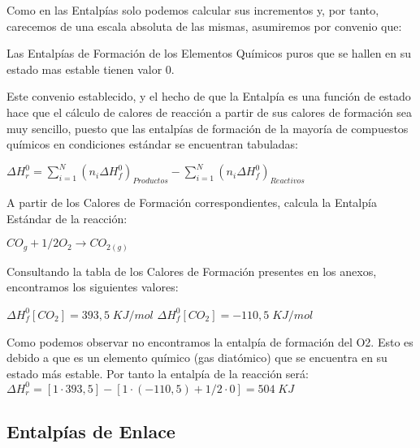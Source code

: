 Como en las Entalpías solo podemos calcular sus incrementos y, por tanto, carecemos de una escala absoluta de las mismas, asumiremos por convenio que:\\

\begin{definition}
Las Entalpías de Formación de los Elementos Químicos puros que se hallen en su estado mas estable tienen valor 0.
\end{definition}

Este convenio establecido, y el hecho de que la Entalpía es una función de estado hace que el cálculo de calores de reacción a partir de sus calores de formación sea muy sencillo, puesto que las entalpías de formación de la mayoría de compuestos químicos en condiciones estándar se encuentran tabuladas:

\begin{center}
	$\Delta H^{0}_r = \displaystyle\sum_{i = 1}^{N}(n_i\Delta H^{0}_f)_{Productos} - \displaystyle\sum_{i=1}^{N}(n_i\Delta H^{0}_f)_{Reactivos}$
\end{center}

\begin{exercise}
A partir de los Calores de Formación correspondientes, calcula la Entalpía Estándar de la reacción:
	
	\begin{center}
		$CO_{g} + 1/2 O_2 \longrightarrow CO_{2(g)}$
	\end{center}

Consultando la tabla de los Calores de Formación presentes en los anexos, encontramos los siguientes valores:\\

\begin{center}
	$\Delta H^{0}_f[CO_2] = 393,5\; KJ/mol$ \hspace{3cm} $\Delta H^{0}_f[CO_2] = -110,5\; KJ/mol$
\end{center}
Como podemos observar no encontramos la entalpía de formación del O2. Esto es debido a que es un elemento químico (gas diatómico) que se encuentra en su estado más estable. Por tanto la entalpía de la reacción será:\\

$\Delta H^{0}_r = [1\cdot393,5] - [1\cdot(-110,5) + 1/2\cdot0] = 504\; KJ$
	
\end{exercise}

\subsection{Entalpías de Enlace}

